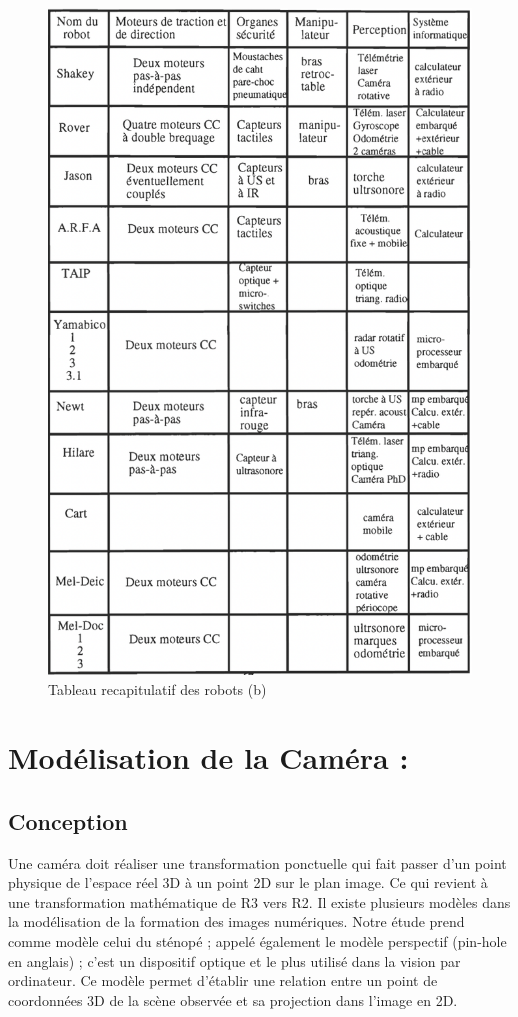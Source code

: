 \begin{figure}[h]
    \centering
    \includegraphics[width=14cm]{assets/Chapter2/chapitre2tab2.png}
    \caption{Tableau recapitulatif des robots (b)}
    \label{bottab2}

\end{figure}
\newpage
\section{Modélisation de la Caméra :}
\subsection{Conception}
Une caméra doit réaliser une transformation ponctuelle qui fait passer d’un point 
physique de l’espace réel 3D à un point 2D sur le plan image. Ce qui revient à une 
transformation mathématique de R3 vers R2.
Il existe plusieurs modèles dans la modélisation de la formation des images numériques. 
Notre étude prend comme modèle celui du sténopé ; appelé également le modèle perspectif 
(pin-hole en anglais) ; c'est un dispositif optique et le plus utilisé dans la vision par ordinateur. 
Ce modèle permet d'établir une relation entre un point de coordonnées 3D de la scène 
observée et sa projection dans l'image en 2D.
